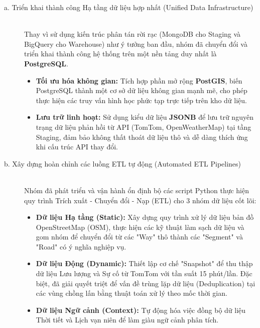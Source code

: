 \begin{description}
    \item[a. Triển khai thành công Hạ tầng dữ liệu hợp nhất (Unified Data Infrastructure)] \hfill \\
    Thay vì sử dụng kiến trúc phân tán rời rạc (MongoDB cho Staging và BigQuery cho Warehouse) như ý tưởng ban đầu, nhóm đã chuyển đổi và triển khai thành công hệ thống trên một nền tảng duy nhất là \textbf{PostgreSQL}.
    \begin{itemize}
        \item \textbf{Tối ưu hóa không gian:} Tích hợp phần mở rộng \textbf{PostGIS}, biến PostgreSQL thành một cơ sở dữ liệu không gian mạnh mẽ, cho phép thực hiện các truy vấn hình học phức tạp trực tiếp trên kho dữ liệu.
        \item \textbf{Lưu trữ linh hoạt:} Sử dụng kiểu dữ liệu \textbf{JSONB} để lưu trữ nguyên trạng dữ liệu phản hồi từ API (TomTom, OpenWeatherMap) tại tầng Staging, đảm bảo không thất thoát dữ liệu thô và dễ dàng thích ứng khi cấu trúc API thay đổi.
    \end{itemize}
    
    \item[b. Xây dựng hoàn chỉnh các luồng ETL tự động (Automated ETL Pipelines)] \hfill \\
    Nhóm đã phát triển và vận hành ổn định bộ các script Python thực hiện quy trình Trích xuất - Chuyển đổi - Nạp (ETL) cho 3 nhóm dữ liệu cốt lõi:
    \begin{itemize}
        \item \textbf{Dữ liệu Hạ tầng (Static):} Xây dựng quy trình xử lý dữ liệu bản đồ OpenStreetMap (OSM), thực hiện các kỹ thuật làm sạch dữ liệu và gom nhóm để chuyển đổi từ các "Way" thô thành các "Segment" và "Road" có ý nghĩa nghiệp vụ.
        \item \textbf{Dữ liệu Động (Dynamic):} Thiết lập cơ chế "Snapshot" để thu thập dữ liệu Lưu lượng và Sự cố từ TomTom với tần suất 15 phút/lần. Đặc biệt, đã giải quyết triệt để vấn đề trùng lặp dữ liệu (Deduplication) tại các vùng chồng lấn bằng thuật toán xử lý theo mốc thời gian.
        \item \textbf{Dữ liệu Ngữ cảnh (Context):} Tự động hóa việc đồng bộ dữ liệu Thời tiết và Lịch vạn niên để làm giàu ngữ cảnh phân tích.
    \end{itemize}
    

\end{description}
